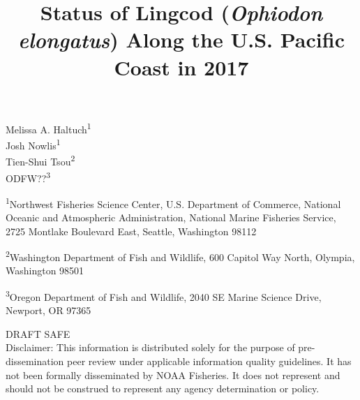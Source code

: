 \documentclass[12pt,]{article}
\title{Status of Lingcod (\emph{Ophiodon elongatus}) Along the U.S. Pacific
Coast in 2017}
\author{}
\date{}
\begin{document}
\maketitle


\begin{center}
\thispagestyle{empty}


\vspace{.5cm}




Melissa A. Haltuch\textsuperscript{1}\\
Josh Nowlis\textsuperscript{1}\\
Tien-Shui Tsou\textsuperscript{2}\\
ODFW??\textsuperscript{3}\\

\vspace{.5cm}

\small
\textsuperscript{1}Northwest Fisheries Science Center, U.S. Department of Commerce, National Oceanic and Atmospheric Administration, National Marine Fisheries Service, 2725 Montlake Boulevard East, Seattle, Washington 98112\\

\vspace{.3cm}

\textsuperscript{2}Washington Department of Fish and Wildlife, 600 Capitol Way North, Olympia, Washington 98501\\

\vspace{.3cm}

\textsuperscript{3}Oregon Department of Fish and Wildlife, 2040 SE Marine Science Drive, Newport, OR 97365\\


\vspace{.5cm}

\vfill
DRAFT SAFE\\
Disclaimer: This information is distributed solely for the purpose of pre-dissemination
peer review under applicable information quality guidelines. It has not been formally
disseminated by NOAA Fisheries. It does not represent and should not be construed to
represent any agency determination or policy. 


\end{center}
\end{document}

